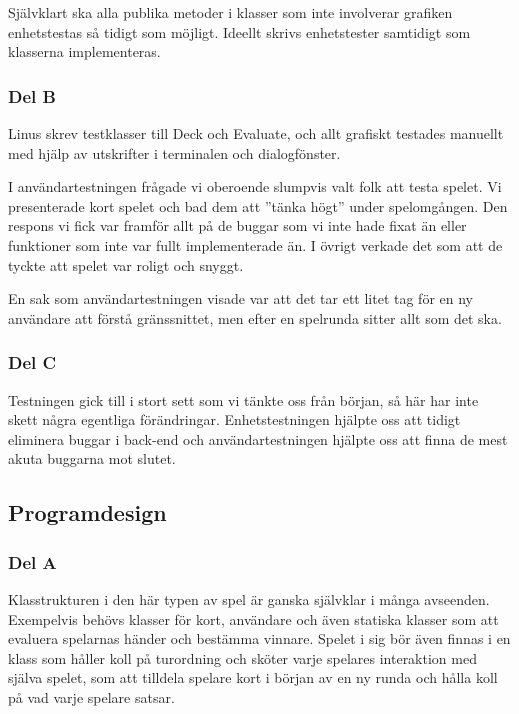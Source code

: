 \documentclass[10pt,a4paper]{article}
\begin{document}
Självklart ska alla publika metoder i klasser som inte involverar grafiken
enhetstestas så tidigt som möjligt. Ideellt skrivs enhetstester samtidigt
som klasserna implementeras.

\subsubsection*{Del B}

Linus skrev testklasser till Deck och Evaluate, och allt grafiskt testades
manuellt med hjälp av utskrifter i terminalen och dialogfönster.

I användartestningen frågade vi oberoende slumpvis valt folk att testa
spelet. Vi presenterade kort spelet och bad dem att ''tänka högt'' under
spelomgången. Den respons vi fick var framför allt på de buggar som vi inte
hade fixat än eller funktioner som inte var fullt implementerade än. I
övrigt verkade det som att de tyckte att spelet var roligt och snyggt.

En sak som användartestningen visade var att det tar ett litet tag för en
ny användare att förstå gränssnittet, men efter en spelrunda sitter allt
som det ska.

\subsubsection*{Del C}

Testningen gick till i stort sett som vi tänkte oss från början, så här har inte skett några egentliga förändringar.
Enhetstestningen hjälpte oss att tidigt eliminera buggar i back-end och
användartestningen hjälpte oss att finna de mest akuta buggarna mot slutet.

\subsection*{Programdesign}

\subsubsection*{Del A}

Klasstrukturen i den här typen av spel är ganska självklar i många
avseenden. Exempelvis behövs klasser för kort, användare och även statiska
klasser som att evaluera spelarnas händer och bestämma vinnare. Spelet i
sig bör även finnas i en klass som håller koll på turordning och sköter
varje spelares interaktion med själva spelet, som att tilldela spelare kort
i början av en ny runda och hålla koll på vad varje spelare satsar.
\end{document}
